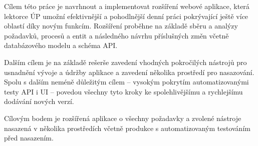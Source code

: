 Cílem této práce je navrhnout a implementovat rozšíření webové aplikace, která lektorce ÚP umožní efektivnější a pohodlnější denní práci pokrývající ještě více oblastí díky novým funkcím. Rozšíření proběhne na základě sběru a analýzy požadavků, procesů a entit a následného návrhu příslušných změn včetně databázového modelu a schéma API.

Dalším cílem je na základě rešerše zavedení vhodných pokročilých nástrojů pro usnadnění vývoje a údržby aplikace a zavedení několika prostředí pro nasazování. Spolu s dalším neméně důležitým cílem -- vysokým pokrytím automatizovanými testy API i UI -- povedou všechny tyto kroky ke spolehlivějšímu a rychlejšímu dodávání nových verzí.

Cílovým bodem je rozšířená aplikace o všechny požadavky a zvolené nástroje nasazená v několika prostředích včetně produkce s automatizovaným testováním před nasazením.

